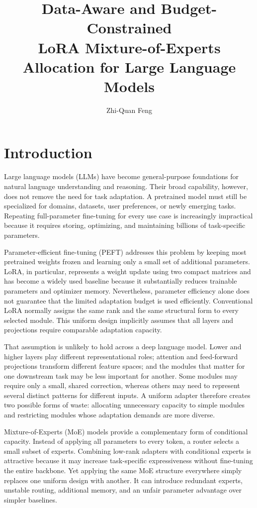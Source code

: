 \documentclass{article}
\title{Data-Aware and Budget-Constrained\\LoRA Mixture-of-Experts Allocation for Large Language Models}
\author{Zhi-Quan Feng}
\date{}
\begin{document}
\maketitle
\fontsize{11pt}{11pt}\selectfont

\section{Introduction}


Large language models (LLMs) have become general-purpose foundations for natural language understanding and reasoning. Their broad capability, however, does not remove the need for task adaptation. A pretrained model must still be specialized for domains, datasets, user preferences, or newly emerging tasks. Repeating full-parameter fine-tuning for every use case is increasingly impractical because it requires storing, optimizing, and maintaining billions of task-specific parameters.

Parameter-efficient fine-tuning (PEFT) addresses this problem by keeping most pretrained weights frozen and learning only a small set of additional parameters. LoRA\cite{LORA}, in particular, represents a weight update using two compact matrices and has become a widely used baseline because it substantially reduces trainable parameters and optimizer memory. Nevertheless, parameter efficiency alone does not guarantee that the limited adaptation budget is used efficiently. Conventional LoRA normally assigns the same rank and the same structural form to every selected module. This uniform design implicitly assumes that all layers and projections require comparable adaptation capacity.

That assumption is unlikely to hold across a deep language model. Lower and higher layers play different representational roles; attention and feed-forward projections transform different feature spaces; and the modules that matter for one downstream task may be less important for another. Some modules may require only a small, shared correction, whereas others may need to represent several distinct patterns for different inputs. A uniform adapter therefore creates two possible forms of waste: allocating unnecessary capacity to simple modules and restricting modules whose adaptation demands are more diverse.

Mixture-of-Experts (MoE) models provide a complementary form of conditional capacity. Instead of applying all parameters to every token, a router selects a small subset of experts\cite{SPARSEMOE,HYPERROUTER,DEEPSEEKV3}. Combining low-rank adapters with conditional experts is attractive because it may increase task-specific expressiveness without fine-tuning the entire backbone. Yet applying the same MoE structure everywhere simply replaces one uniform design with another. It can introduce redundant experts, unstable routing, additional memory, and an unfair parameter advantage over simpler baselines.
\end{document}
